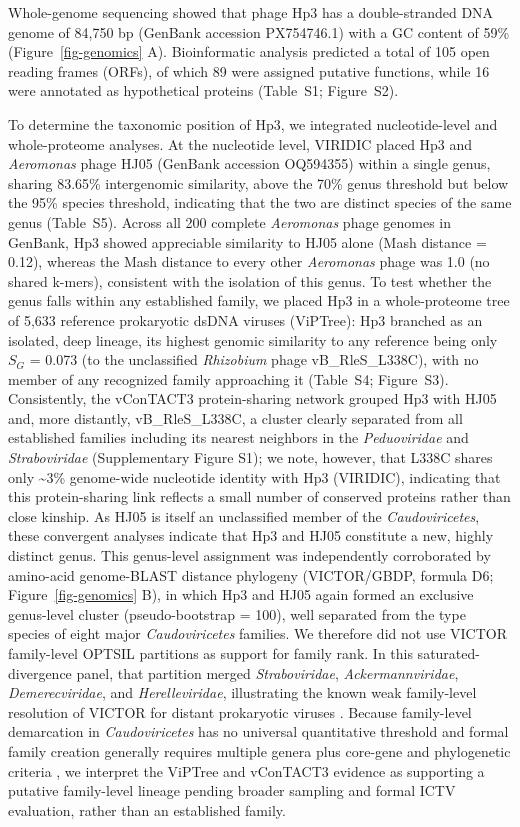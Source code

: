 Whole-genome sequencing showed that phage Hp3 has a
double-stranded DNA genome of 84,750 bp (GenBank accession PX754746.1)
with a GC content of 59\% (Figure~\ref{fig-genomics} A). Bioinformatic analysis predicted a total
of 105 open reading frames (ORFs), of which 89 were assigned putative
functions, while 16 were annotated as hypothetical proteins
(Table~S1; Figure~S2).

To determine the taxonomic position of Hp3, we integrated
nucleotide-level and whole-proteome analyses. At the
nucleotide level, VIRIDIC placed Hp3 and \emph{Aeromonas} phage HJ05
(GenBank accession OQ594355) within a single genus, sharing 83.65\%
intergenomic similarity, above the 70\% genus threshold but below the
95\% species threshold, indicating that the two are distinct species of
the same genus (Table~S5). Across all 200 complete
\emph{Aeromonas} phage genomes in GenBank, Hp3 showed appreciable
similarity to HJ05 alone (Mash distance = 0.12), whereas the Mash
distance to every other \emph{Aeromonas} phage was 1.0 (no shared
k-mers), consistent with the isolation of this genus. To test whether the
genus falls within any established family, we placed Hp3 in a
whole-proteome tree of 5,633 reference prokaryotic dsDNA viruses
(ViPTree): Hp3 branched as an isolated, deep lineage, its highest
genomic similarity to any reference being only \(S_G\) = 0.073 (to the
unclassified \emph{Rhizobium} phage vB\_RleS\_L338C), with no member of
any recognized family approaching it (\mbox{Table~S4}; Figure~S3). Consistently, the vConTACT3
protein-sharing network grouped Hp3 with HJ05 and, more distantly,
vB\_RleS\_L338C, a cluster clearly separated from all established
families including its nearest neighbors in the \emph{Peduoviridae} and
\emph{Straboviridae} (Supplementary Figure S1); we note, however,
that L338C shares only \textasciitilde3\% genome-wide nucleotide
identity with Hp3 (VIRIDIC), indicating that this protein-sharing link
reflects a small number of conserved proteins rather than close kinship.
As HJ05 is itself an unclassified member of the \emph{Caudoviricetes},
these convergent analyses indicate that Hp3 and HJ05 constitute a new,
highly distinct genus. This genus-level assignment was independently
corroborated by amino-acid genome-BLAST distance phylogeny
(VICTOR/GBDP, formula D6; Figure~\ref{fig-genomics} B), in which Hp3 and HJ05 again formed an
exclusive genus-level cluster (pseudo-bootstrap = 100), well separated
from the type species of eight major \emph{Caudoviricetes} families. We
therefore did not use VICTOR family-level OPTSIL partitions as support
for family rank. In this saturated-divergence panel, that partition
merged \emph{Straboviridae}, \emph{Ackermannviridae},
\emph{Demerecviridae}, and \emph{Herelleviridae}, illustrating the
known weak family-level resolution of VICTOR for distant prokaryotic
viruses \citep{2017-VICTOR_Meier-Kolthoff}. Because family-level
demarcation in \emph{Caudoviricetes} has no universal quantitative
threshold and formal family creation generally requires multiple genera
plus core-gene and phylogenetic criteria
\citep{2021-Roadmap_Turner,2023-Abolishment_Turner}, we interpret the
ViPTree and vConTACT3 evidence as supporting a putative
family-level lineage pending broader sampling and formal ICTV
evaluation, rather than an established family.

